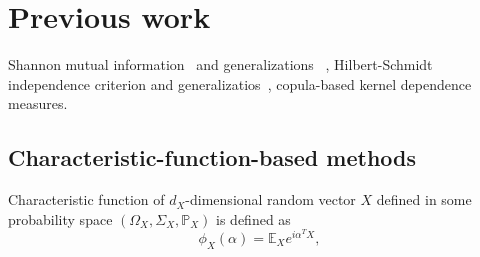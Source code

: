 \documentclass{article}
\begin{document}
\section{Previous work}
\label{section:previous_work}
Shannon mutual information~\cite{Cover2006} and generalizations ~\cite{e20110813},  Hilbert-Schmidt independence criterion \cite{Gretton2005MeasuringSD} and generalizatios~\cite{?}, \cite{Pczos2012CopulabasedKD} copula-based kernel dependence measures.

\subsection{Characteristic-function-based methods}
\label{section:previous_work_cf}
Characteristic function of $d_{X}$-dimensional random vector $X$ defined in some probability space $(\Omega_{X}, \Sigma_{X}, \mathbb{P}_{X})$ is defined as 
\begin{equation}
    \label{eq:characteristic_function}
    \phi_{X}(\alpha) = \mathbb{E}_{X} e^{i\alpha^{T}X}, 
\end{equation}
\end{document}
